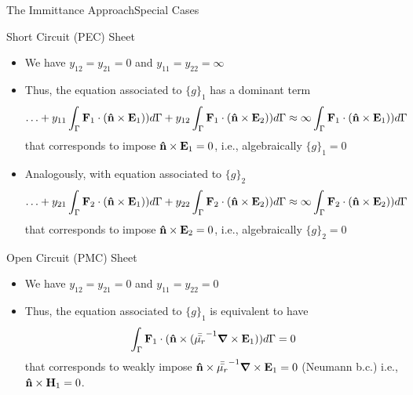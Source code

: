 \begin{frame}[allowframebreaks]{The Immittance Approach}{Special Cases}
  
  \begin{block}{Short Circuit (PEC) Sheet}
    \begin{itemize}
    \item We have $y_{12}=y_{21}=0$ and $y_{11}=y_{22}=\infty$
    \item Thus, the equation associated to $\lbrace g\rbrace_1$ has
      a dominant term 
%      
      \begin{equation*}
        \ldots + y_{11} \int_{\Gamma} \mathbf{F}_1\cdot(\mathbf{\hat{n}}  \times \mathbf{E}_1 )) d\Gamma
        + y_{12}\int_{\Gamma} \mathbf{F}_1\cdot(\mathbf{\hat{n}}  \times \mathbf{E}_2 )) d\Gamma
        \approx
        \infty \int_{\Gamma} \mathbf{F}_1\cdot(\mathbf{\hat{n}}  \times \mathbf{E}_1 )) d\Gamma
      \end{equation*}
     that corresponds to impose $\mathbf{\hat{n}}\times\mathbf{E}_1=0$,
      i.e., algebraically $\lbrace g\rbrace_1=0$
      
    \item Analogously, with equation associated to
      $\lbrace g\rbrace_2$
      \begin{equation*}
        \ldots + y_{21} \int_{\Gamma} \mathbf{F}_2\cdot(\mathbf{\hat{n}}  \times \mathbf{E}_1 )) d\Gamma
        + y_{22}\int_{\Gamma} \mathbf{F}_2\cdot(\mathbf{\hat{n}}  \times \mathbf{E}_2 )) d\Gamma
        \approx
        \infty \int_{\Gamma} \mathbf{F}_2\cdot(\mathbf{\hat{n}}  \times \mathbf{E}_2 )) d\Gamma
      \end{equation*}
     that corresponds to impose $\mathbf{\hat{n}}\times\mathbf{E}_2=0$,
      i.e., algebraically $\lbrace g\rbrace_2=0$
      
    \end{itemize}
  \end{block}
  
  \framebreak  %
  
  \begin{block}{Open Circuit (PMC) Sheet}
    \begin{itemize}
    \item We have $y_{12}=y_{21}=0$ and $y_{11}=y_{22}=0$
    \item Thus, the equation associated to $\lbrace g\rbrace_1$ is
      equivalent to have
%      
      \begin{equation*}
        \int_{\Gamma} \mathbf{F}_1\cdot(\mathbf{\hat{n}} \times ( {\bar{\bar{\mu_r}}}^{-1} \boldsymbol{\nabla} \times \mathbf{E}_1 )) d\Gamma = 0
      \end{equation*}
      that corresponds to weakly impose
      $\mathbf{\hat{n}}\times{\bar{\bar{\mu_r}}}^{-1}\boldsymbol{\nabla}\times\mathbf{E}_1=0$ (Neumann b.c.)  i.e.,
      $\mathbf{\hat{n}}\times\mathbf{H}_1=0$.
      

\end{itemize}
\end{block}
\end{frame}
